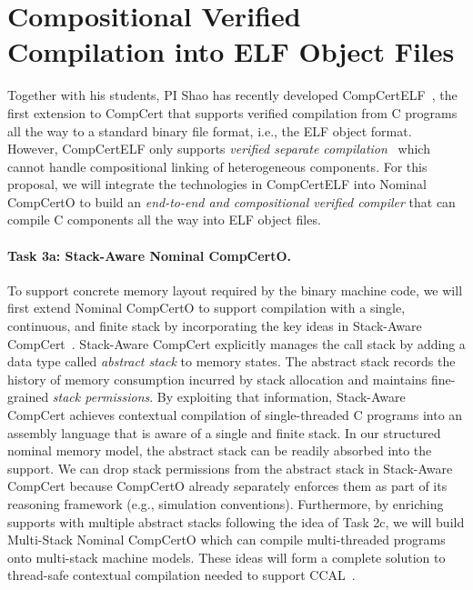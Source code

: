 \section{Compositional Verified Compilation into ELF Object Files}

Together with his students, PI Shao has recently developed
CompCertELF~\cite{compcertelf20}, the first extension to CompCert that
supports verified compilation from C programs all the way to a
standard binary file format, i.e., the ELF object format.  However,
CompCertELF only supports {\em{}verified separate
compilation}~\cite{sepcompcert} which cannot handle compositional linking of
heterogeneous components.  For this proposal, we will integrate the
technologies in CompCertELF into Nominal CompCertO to build an {\em
  end-to-end and compositional verified compiler} that can compile C
components all the way into ELF object files.

\vspace*{-2ex}
\paragraph*{Task 3a: Stack-Aware Nominal CompCertO.}
To support concrete memory layout required by the binary machine code,
we will first extend Nominal CompCertO to support compilation with a
single, continuous, and finite stack by incorporating the key ideas in
Stack-Aware CompCert~\cite{wang2019,compcertelf20}.  Stack-Aware
CompCert explicitly manages the call stack by adding a data type
called \emph{abstract stack} to memory states. The abstract stack
records the history of memory consumption incurred by stack allocation
and maintains fine-grained \emph{stack permissions}. By exploiting
that information, Stack-Aware CompCert achieves contextual compilation
of single-threaded C programs into an assembly language that is aware
of a single and finite stack.  In our structured nominal memory model,
the abstract stack can be readily absorbed into the support. We can
drop stack permissions from the abstract stack in Stack-Aware CompCert
because CompCertO already separately enforces them as part of its
reasoning framework (e.g., simulation conventions).  Furthermore, by
enriching supports with multiple abstract stacks following the idea of
Task 2c, we will build Multi-Stack Nominal CompCertO which can compile
multi-threaded programs onto multi-stack machine models. These ideas
will form a complete solution to thread-safe contextual compilation
needed to support CCAL~\cite{ccal18}.

